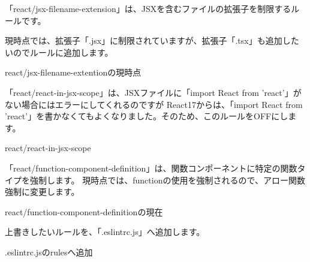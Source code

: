 「react/jsx{-}filename{-}extension」は、JSXを含むファイルの拡張子を制限するルールです。

現時点では、拡張子「.jsx」に制限されていますが、拡張子「.tsx」も追加したいのでルールに追加します。

\def\startercodeblockfontsize{}
\begin{starterprogram}[]{react/jsx{-}filename{-}extentionの現時点}\end{starterprogram}

「react/react{-}in{-}jsx{-}scope」は、JSXファイルに「import React from 'react'」がない場合にはエラーにしてくれるのですが
React17からは、「import React from 'react'」を書かなくてもよくなりました。そのため、このルールをOFFにします。

\def\startercodeblockfontsize{}
\begin{starterprogram}[]{react/react{-}in{-}jsx{-}scope}\end{starterprogram}

「react/function{-}component{-}definition」は、関数コンポーネントに特定の関数タイプを強制します。
現時点では、functionの使用を強制されるので、アロー関数強制に変更します。

\def\startercodeblockfontsize{}
\begin{starterprogram}[]{react/function{-}component{-}definitionの現在}\end{starterprogram}

上書きしたいルールを、「.eslintrc.js」へ追加します。

\def\startercodeblockfontsize{}
\begin{starterprogram}[]{.eslintrc.jsのrulesへ追加}\end{starterprogram}


